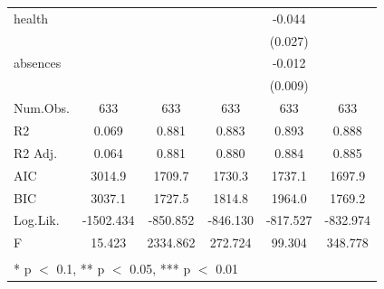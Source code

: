 \documentclass[12pt,english]{article}
\begin{document}
\begin{longtable}[c]{lccccc}
health &  &  &  & -0.044 & \\
 &  &  &  & (0.027) & \\
absences &  &  &  & -0.012 & \\
 &  &  &  & (0.009) & \\
\hline
Num.Obs. & 633 & 633 & 633 & 633 & 633\\
R2 & 0.069 & 0.881 & 0.883 & 0.893 & 0.888\\
R2 Adj. & 0.064 & 0.881 & 0.880 & 0.884 & 0.885\\
AIC & 3014.9 & 1709.7 & 1730.3 & 1737.1 & 1697.9\\
BIC & 3037.1 & 1727.5 & 1814.8 & 1964.0 & 1769.2\\
Log.Lik. & -1502.434 & -850.852 & -846.130 & -817.527 & -832.974\\
F & 15.423 & 2334.862 & 272.724 & 99.304 & 348.778\\
\hline
\multicolumn{5}{2}{\textsuperscript{} * p $<$ 0.1, ** p $<$ 0.05, *** p $<$ 0.01}\\
\end{longtable}
\end{document}
